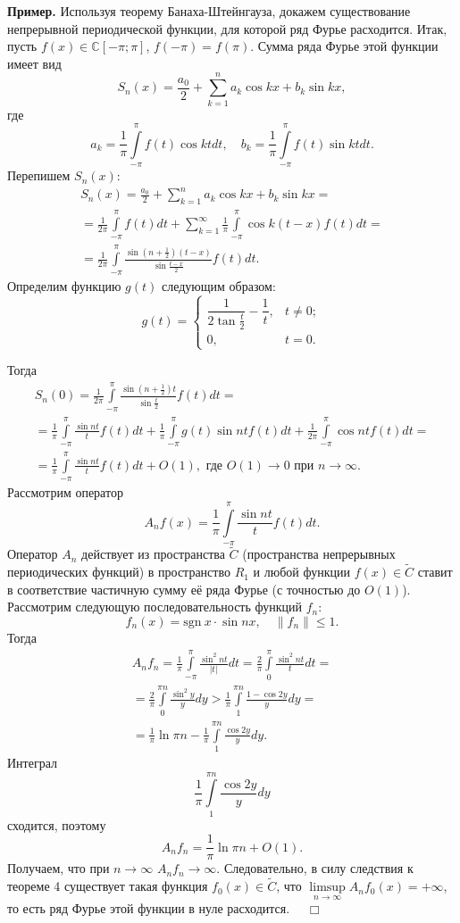 \documentclass[12pt,a4paper, titlepage]{article}
\begin{document}
\textbf{Пример.} Используя теорему Банаха-Штейнгауза, докажем существование непрерывной периодической функции, для которой ряд Фурье расходится. Итак, пусть $f(x) \in \mathbb C [-\pi ; \pi]$, $f(-\pi) = f(\pi)$. Сумма ряда Фурье этой функции имеет вид
$$
S_n(x) = \frac {a_0} 2 + \sum_{k=1}^n a_k \cos kx + b_k \sin kx,
$$
где
$$
a_k = \frac 1 \pi \int\limits_{-\pi}^\pi f(t) \cos kt dt, \quad b_k = \frac 1 \pi \int\limits_{-\pi}^\pi f(t) \sin kt dt.
$$
Перепишем $S_n(x)$:
\begin{multline*}
S_n(x) = \frac {a_0} 2 + \sum_{k=1}^n a_k \cos kx + b_k \sin kx = \\
= \frac 1 {2\pi} \int\limits_{-\pi}^\pi f(t) dt +
\sum_{k=1}^\infty \frac 1 \pi \int\limits_{-\pi}^\pi \cos k(t-x) f(t) dt = \\
= \frac 1 {2\pi} \int\limits_{-\pi}^\pi \frac{\sin (n+ \frac 1 2)(t-x)}{\sin \frac{t-x} 2 } f(t) dt.
\end{multline*}
Определим функцию $g(t)$ следующим образом:
$$
g(t) = \begin{cases}
\dfrac 1 {2 \tan \frac t 2 } - \dfrac 1 t, & t \neq 0; \\
0, & t = 0.
\end{cases}
$$

Тогда
\begin{multline*}
S_n(0) = \frac 1 {2\pi} \int\limits_{-\pi}^\pi \frac {\sin (n+ \frac 1 2) t}{\sin \frac t 2} f(t) dt =  \\
= \frac 1 \pi \int\limits_{-\pi}^\pi \frac{\sin nt} t f(t) dt +
\frac 1 \pi \int\limits_{-\pi}^\pi g(t) \sin nt f(t) dt +
\frac 1 {2\pi} \int\limits_{-\pi}^\pi \cos nt f(t) dt = \\
= \frac 1 {\pi} \int\limits_{-\pi}^{\pi} \frac{\sin nt}{t} f(t) dt + O(1), \text{ где $O(1)\to 0$ при $n\to\infty$}.
\end{multline*}
Рассмотрим оператор
$$
A_n f(x) = \frac 1 \pi \int\limits_{-\pi}^\pi \frac {\sin nt} t f(t) dt.
$$
Оператор $A_n$ действует из пространства $\widetilde C$ (пространства непрерывных периодических функций) в пространство $R_1$ и любой функции $f(x) \in \widetilde C$ ставит в соответствие частичную сумму её ряда Фурье (с точностью до $O(1)$). Рассмотрим следующую последовательность функций $f_n$:
$$
f_n(x) = \mathrm{sgn} \ x \cdot \sin nx, \quad \|f_n\| \leqslant 1.
$$
Тогда
\begin{multline*}
A_n f_n = \frac 1 \pi \int\limits_{-\pi}^\pi \frac {\sin^2 nt}{|t|} dt =
\frac 2 \pi \int\limits_0^\pi \frac {\sin^2 nt} t dt = \\
= \frac 2 \pi \int\limits_0^{\pi n} \frac {\sin^2 y} y dy >
\frac 1 \pi \int\limits_1^{\pi n} \frac{1 - \cos 2y}{y}dy = \\
= \frac 1 \pi \ln \pi n - \frac 1 \pi \int\limits_1^{\pi n} \frac{\cos 2y}{y}dy.
\end{multline*}
Интеграл
$$
\frac 1 \pi \int\limits_1^{\pi n} \frac{\cos 2y}{y}dy
$$
сходится, поэтому
$$
A_n f_n = \frac 1 \pi \ln \pi n + O(1).
$$
Получаем, что при $n\to\infty$ $A_n f_n \to \infty$. Следовательно, в силу следствия к теореме 4 существует такая функция $f_0(x) \in \widetilde C$, что $\limsup\limits_{n\to\infty} A_n f_0(x) = +\infty$, то есть ряд Фурье этой функции в нуле расходится. $\quad \Box$\\
\end{document}
